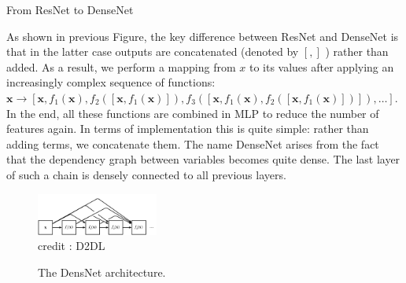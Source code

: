 \begin{vbframe}{From ResNet to DenseNet}
  
  As shown in previous Figure, the key difference between ResNet and DenseNet is that in the latter case outputs are concatenated (denoted by  $[,]$ ) rather than added. As a result, we perform a mapping from  $x$  to its values after applying an increasingly complex sequence of functions:
  \newline
  \newline
$\mathbf{x} \to \left[ \mathbf{x}, f_1(\mathbf{x}), f_2([\mathbf{x}, f_1(\mathbf{x})]), f_3([\mathbf{x}, f_1(\mathbf{x}), f_2([\mathbf{x}, f_1(\mathbf{x})])]), \ldots\right].$
\newline
\newline
In the end, all these functions are combined in MLP to reduce the number of features again. In terms of implementation this is quite simple: rather than adding terms, we concatenate them. 
\newline
The name DenseNet arises from the fact that the dependency graph between variables becomes quite dense. The last layer of such a chain is densely connected to all previous layers. 
  \begin{figure}
    \centering
    \includegraphics[width=4cm]{plots/moderncnn/densenet.png}
    \tiny{\\ credit : D2DL}
    \caption{The DensNet architecture.}
  \end{figure}
  
 \end{vbframe}




